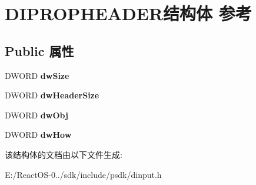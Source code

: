 \hypertarget{struct_d_i_p_r_o_p_h_e_a_d_e_r}{}\section{D\+I\+P\+R\+O\+P\+H\+E\+A\+D\+E\+R结构体 参考}
\label{struct_d_i_p_r_o_p_h_e_a_d_e_r}
\subsection*{Public 属性}
\begin{DoxyCompactItemize}
\item 
\mbox{\label{struct_d_i_p_r_o_p_h_e_a_d_e_r_a38d34f23793a152d13067921f8583b30}} 
D\+W\+O\+RD {\bfseries dw\+Size}
\item 
\mbox{\label{struct_d_i_p_r_o_p_h_e_a_d_e_r_ac637a7839438133dc9f2bb48a5bfd598}} 
D\+W\+O\+RD {\bfseries dw\+Header\+Size}
\item 
\mbox{\label{struct_d_i_p_r_o_p_h_e_a_d_e_r_a15246b889cf543916b09e864c12f6254}} 
D\+W\+O\+RD {\bfseries dw\+Obj}
\item 
\mbox{\label{struct_d_i_p_r_o_p_h_e_a_d_e_r_af285da4392d38e2b00a2d6a9204e66b1}} 
D\+W\+O\+RD {\bfseries dw\+How}
\end{DoxyCompactItemize}


该结构体的文档由以下文件生成\+:\begin{DoxyCompactItemize}
\item 
E\+:/\+React\+O\+S-\/0../sdk/include/psdk/dinput.\+h\end{DoxyCompactItemize}
